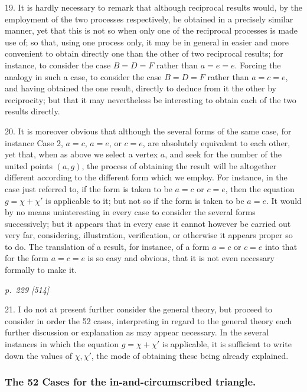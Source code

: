\documentclass[11pt,a4paper]{article}
\theoremstyle{plain}
\theoremstyle{definition}
\begin{document}
19. It is hardly necessary to remark that although reciprocal results would, by
the employment of the two processes respectively, be obtained in a precisely similar
manner, yet that this is not so when only one of the reciprocal processes is made
use of; so that, using one process only, it may be in general in easier and more
convenient to obtain directly one than the other of two reciprocal results; for instance,
to consider the case $B=D=F$ rather than $a=e=e$.  Forcing the analogy in such a case,
to consider the case $B=D=F$ rather than $a=c=e$, and having obtained the one result, directly to deduce from it
the other by reciprocity; but that it may nevertheless be interesting to obtain each
of the two results directly.

20. It is moreover obvious that although the several forms of the same case, for
instance Case 2, $a=c$, $a=e$, or $c=e$, are absolutely equivalent to each other, yet that,
when as above we select a vertex $a$, and seek for the number of the united points
$(a, g)$, the process of obtaining the result will be altogether different according to the
different form which we employ.  For instance, in the case just referred to, if the
form is taken to be $a=c$ or $c=e$, then the equation $g=\chi+\chi'$ is applicable to it;
but not so if the form is taken to be $a=e$.  It would by no means uninteresting
in every case to consider the several forms successively; but it appears that in
every case it cannot however be carried out very far, considering, illustration, verification, or otherwise it appears
proper so to do.  The translation of a result, for instance, of a form $a=c$ or $c=e$
into that for the form $a=c=e$ is so easy and obvious, that it is not even necessary
formally to make it.

\clearpage

\bigskip
\textit{p.~229 [514]}
\smallskip

21. I do not at present further consider the general theory, but proceed to consider
in order the 52 cases, interpreting in regard to the general theory each further
discussion or explanation as may appear necessary.  In the several instances in which
the equation $g=\chi+\chi'$ is applicable, it is sufficient to write down the values of $\chi, \chi'$,
the mode of obtaining these being already explained.

\subsubsection*{The 52 Cases for the in-and-circumscribed triangle.}
\end{document}
